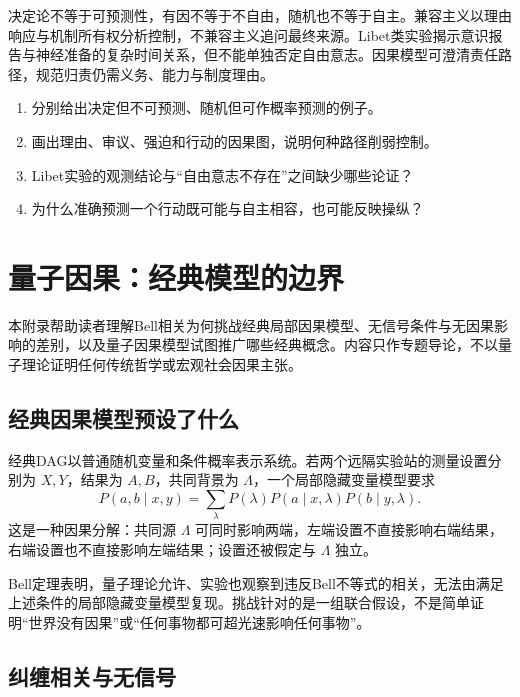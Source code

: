\begin{chapterreview}
决定论不等于可预测性，有因不等于不自由，随机也不等于自主。兼容主义以理由响应与机制所有权分析控制，不兼容主义追问最终来源。Libet类实验揭示意识报告与神经准备的复杂时间关系，但不能单独否定自由意志。因果模型可澄清责任路径，规范归责仍需义务、能力与制度理由。
\end{chapterreview}

\begin{selfcheck}
\begin{enumerate}
  \item 分别给出决定但不可预测、随机但可作概率预测的例子。
  \item 画出理由、审议、强迫和行动的因果图，说明何种路径削弱控制。
  \item Libet实验的观测结论与“自由意志不存在”之间缺少哪些论证？
  \item 为什么准确预测一个行动既可能与自主相容，也可能反映操纵？
\end{enumerate}
\end{selfcheck}

\section{量子因果：经典模型的边界}

\begin{learninggoals}
本附录帮助读者理解Bell相关为何挑战经典局部因果模型、无信号条件与无因果影响的差别，以及量子因果模型试图推广哪些经典概念。内容只作专题导论，不以量子理论证明任何传统哲学或宏观社会因果主张。
\end{learninggoals}

\subsection{经典因果模型预设了什么}

经典DAG以普通随机变量和条件概率表示系统。若两个远隔实验站的测量设置分别为 $X,Y$，结果为 $A,B$，共同背景为 $\Lambda$，一个局部隐藏变量模型要求
\[
P(a,b\mid x,y)=\sum_\lambda
P(\lambda)P(a\mid x,\lambda)P(b\mid y,\lambda).
\]
这是一种因果分解：共同源 $\Lambda$ 可同时影响两端，左端设置不直接影响右端结果，右端设置也不直接影响左端结果；设置还被假定与 $\Lambda$ 独立。

Bell定理表明，量子理论允许、实验也观察到违反Bell不等式的相关，无法由满足上述条件的局部隐藏变量模型复现\parencite{bell1964}。挑战针对的是一组联合假设，不是简单证明“世界没有因果”或“任何事物都可超光速影响任何事物”。

\subsection{纠缠相关与无信号}

